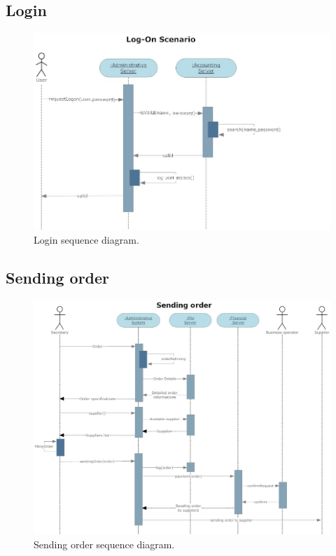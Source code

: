 \subsection{Login}

\begin{figure}
\begin{centering}
\includegraphics[scale=0.45]{assign3/sdraw/imgs/login.jpg}
\caption{Login sequence diagram.}
\label{3img:[sequence]login}
\end{centering}
\end{figure}

\subsection{Sending order}
\begin{figure}
\begin{centering}
\includegraphics[scale=0.45,angle=90]{assign3/sdraw/imgs/sending_order.jpg}
\caption{Sending order sequence diagram.}
\label{3img:[sequence]sending_order}
\end{centering}
\end{figure}


